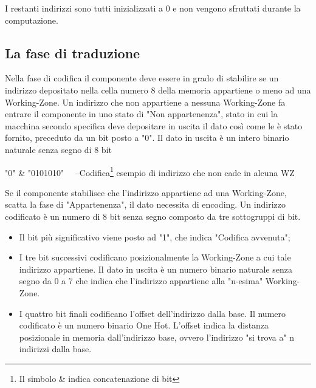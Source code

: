 \documentclass{article}
\newenvironment{gitFont}{\fontfamily{zi4}\selectfont}{\par}
\begin{document}
I restanti indirizzi sono tutti inizializzati a 0 e non vengono sfruttati durante la computazione. 

\subsection{La fase di traduzione}

Nella fase di codifica il componente deve essere in grado di stabilire se un indirizzo depositato nella cella numero 8 della memoria appartiene o meno ad una Working-Zone.
Un indirizzo che non appartiene a nessuna Working-Zone fa entrare il componente in uno stato di "Non appartenenza", stato in cui la macchina secondo specifica deve depositare in uscita il dato così come le è stato fornito, preceduto da un bit posto a "0". Il dato in uscita è un intero binario naturale senza segno di 8 bit

\bigskip

\begin{gitFont}

"0" \& "0101010"  \ \  --Codifica\footnote{Il simbolo \& indica concatenazione di bit} esempio di indirizzo che non cade in alcuna WZ

\end{gitFont}

\bigskip

Se il componente stabilisce che l'indirizzo appartiene ad una Working-Zone, scatta la fase di "Appartenenza", il dato necessita di encoding. 
Un indirizzo codificato è un numero di 8 bit senza segno composto da tre sottogruppi di bit. 

\begin{itemize}
\item Il bit più significativo viene posto ad "1", che indica "Codifica avvenuta";
\item I tre bit successivi codificano posizionalmente la Working-Zone a cui tale indirizzo appartiene. Il dato in uscita è un numero binario naturale senza segno da 0 a 7 che indica che l'indirizzo appartiene alla "n-esima" Working-Zone. 
\item I quattro bit finali codificano l'offset dell'indirizzo dalla base. Il numero codificato è un numero binario One Hot. L'offset indica la distanza posizionale in memoria dall'indirizzo base, ovvero l'indirizzo "si trova a" n indirizzi dalla base.  %
\end{itemize}

\bigskip
\end{document}
